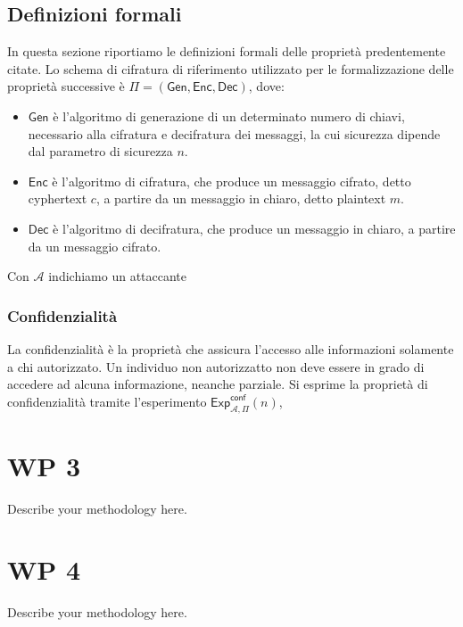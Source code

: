 \documentclass[a4paper,12pt]{article}
\begin{document}
\subsection{Definizioni formali}
In questa sezione riportiamo le definizioni formali delle proprietà predentemente citate. 
\newline 
Lo schema di cifratura di riferimento utilizzato per le formalizzazione delle proprietà successive è $\Pi =\mathsf{(Gen,Enc,Dec)}$, dove: 
\begin{itemize}
    \item $\mathsf{Gen}$ è l'algoritmo di generazione di un determinato numero di chiavi, necessario alla cifratura e decifratura dei messaggi, la cui sicurezza dipende dal parametro di sicurezza $n$.
    \item $\mathsf{Enc}$ è l'algoritmo di cifratura, che produce un messaggio cifrato, detto cyphertext $c$, a partire da un messaggio in chiaro, detto plaintext $m$.
    \item $\mathsf{Dec}$ è l'algoritmo di decifratura, che produce un messaggio in chiaro, a partire da un messaggio cifrato.
\end{itemize}
Con $\mathcal{A}$ indichiamo un attaccante 

\subsubsection{Confidenzialità}
La confidenzialità è la proprietà che assicura l'accesso alle informazioni solamente a chi autorizzato. Un individuo non autorizzatto non deve essere in grado di accedere ad alcuna informazione, neanche parziale. 
\newline Si esprime la proprietà di confidenzialità tramite l'esperimento $\mathsf{Exp}_{\mathcal A,\Pi}^\mathsf{conf}(n)$,


\newpage
\section{WP 3}
Describe your methodology here.
\newpage
\section{WP 4}
Describe your methodology here.
\end{document}
